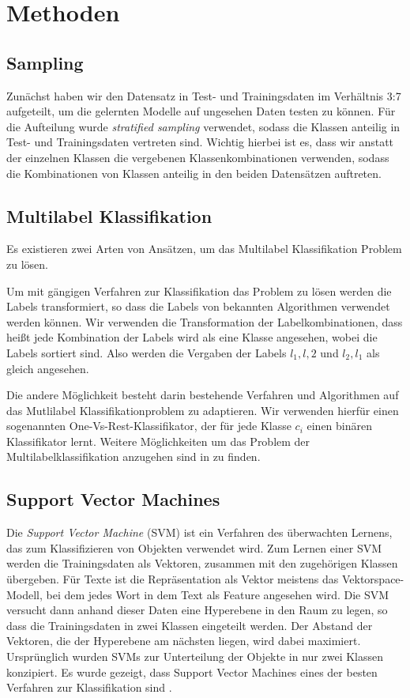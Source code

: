 \section{Methoden}
\subsection{Sampling}

Zunächst haben wir den Datensatz in Test- und Trainingsdaten im Verhältnis 3:7 aufgeteilt, um die gelernten Modelle auf ungesehen Daten testen zu können.
Für die Aufteilung wurde \emph{stratified sampling} verwendet, sodass die Klassen anteilig in Test- und Trainingsdaten vertreten sind.
Wichtig hierbei ist es, dass wir anstatt der einzelnen Klassen die vergebenen Klassenkombinationen verwenden, sodass die Kombinationen von Klassen anteilig in den beiden Datensätzen auftreten.

\subsection{Multilabel Klassifikation}
\label{sub:multilabel_klassifikation}
Es existieren zwei Arten von Ansätzen, um das Multilabel Klassifikation Problem zu lösen.

Um mit gängigen Verfahren zur Klassifikation das Problem zu lösen werden die Labels transformiert,
so dass die Labels von bekannten Algorithmen verwendet werden können. Wir verwenden die Transformation der Labelkombinationen,
dass heißt jede Kombination der Labels wird als eine Klasse angesehen, wobei die Labels sortiert sind. Also werden die Vergaben der Labels
$l_1,l,2$ und $l_2,l_1$ als gleich angesehen.

Die andere Möglichkeit besteht darin bestehende Verfahren und Algorithmen auf das Mutlilabel Klassifikationproblem zu adaptieren.
Wir verwenden hierfür einen sogenannten One-Vs-Rest-Klassifikator, der für jede Klasse $c_i$ einen binären Klassifikator lernt.
Weitere Möglichkeiten um das Problem der Multilabelklassifikation anzugehen sind in \cite{Tsoumakas07multi-labelclassification:} zu finden.

\subsection{Support Vector Machines}
\label{sub:support_vector_machines}
Die \emph{Support Vector Machine} (SVM) ist ein Verfahren des überwachten Lernens, das zum Klassifizieren von Objekten verwendet wird.
Zum Lernen einer SVM werden die Trainingsdaten als Vektoren, zusammen mit den zugehörigen Klassen übergeben.
Für Texte ist die Repräsentation als Vektor meistens das Vektorspace-Modell, bei dem jedes Wort in dem Text als Feature angesehen wird.
Die SVM versucht dann anhand dieser Daten eine Hyperebene in den Raum zu legen, so dass die Trainingsdaten in zwei Klassen eingeteilt werden.
Der Abstand der Vektoren, die der Hyperebene am nächsten liegen, wird dabei maximiert.
Ursprünglich wurden SVMs zur Unterteilung der Objekte in nur zwei Klassen konzipiert.
Es wurde gezeigt, dass Support Vector Machines eines der besten Verfahren zur Klassifikation sind \cite{Joachims:1998:TCS:645326.649721}.

